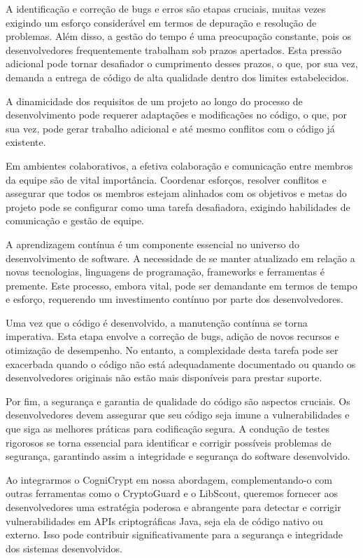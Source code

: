 A identificação e correção de bugs e erros são etapas cruciais, muitas vezes exigindo um esforço considerável em termos de depuração e resolução de problemas. Além disso, a gestão do tempo é uma preocupação constante, pois os desenvolvedores frequentemente trabalham sob prazos apertados. Esta pressão adicional pode tornar desafiador o cumprimento desses prazos, o que, por sua vez, demanda a entrega de código de alta qualidade dentro dos limites estabelecidos. \cite{CogniCrypt}

A dinamicidade dos requisitos de um projeto ao longo do processo de desenvolvimento pode requerer adaptações e modificações no código, o que, por sua vez, pode gerar trabalho adicional e até mesmo conflitos com o código já existente. \cite{CogniCrypt}

Em ambientes colaborativos, a efetiva colaboração e comunicação entre membros da equipe são de vital importância. Coordenar esforços, resolver conflitos e assegurar que todos os membros estejam alinhados com os objetivos e metas do projeto pode se configurar como uma tarefa desafiadora, exigindo habilidades de comunicação e gestão de equipe. \cite{CogniCrypt}

A aprendizagem contínua é um componente essencial no universo do desenvolvimento de software. A necessidade de se manter atualizado em relação a novas tecnologias, linguagens de programação, frameworks e ferramentas é premente. Este processo, embora vital, pode ser demandante em termos de tempo e esforço, requerendo um investimento contínuo por parte dos desenvolvedores. \cite{CogniCrypt}

Uma vez que o código é desenvolvido, a manutenção contínua se torna imperativa. Esta etapa envolve a correção de bugs, adição de novos recursos e otimização de desempenho. No entanto, a complexidade desta tarefa pode ser exacerbada quando o código não está adequadamente documentado ou quando os desenvolvedores originais não estão mais disponíveis para prestar suporte. \cite{CogniCrypt}

Por fim, a segurança e garantia de qualidade do código são aspectos cruciais. Os desenvolvedores devem assegurar que seu código seja imune a vulnerabilidades e que siga as melhores práticas para codificação segura. A condução de testes rigorosos se torna essencial para identificar e corrigir possíveis problemas de segurança, garantindo assim a integridade e segurança do software desenvolvido. \cite{CogniCrypt}

Ao integrarmos o CogniCrypt em nossa abordagem, complementando-o com outras ferramentas como o CryptoGuard e o LibScout, queremos fornecer aos desenvolvedores uma estratégia poderosa e abrangente para detectar e corrigir vulnerabilidades em APIs criptográficas Java, seja ela de código nativo ou externo. Isso pode contribuir significativamente para a segurança e integridade dos sistemas desenvolvidos.


